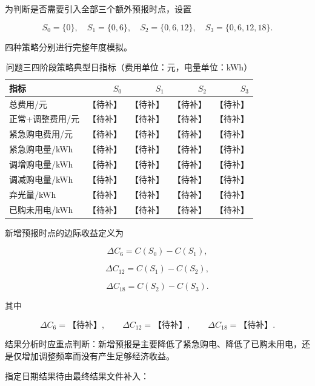 为判断是否需要引入全部三个额外预报时点，设置

\[
S_0=\{0\},
\quad
S_1=\{0,6\},
\quad
S_2=\{0,6,12\},
\quad
S_3=\{0,6,12,18\}.
\]

四种策略分别进行完整年度模拟。

\begin{table}[H]
\centering
{}
\begin{tabular}{lrrrr}
\toprule
指标 & \(S_0\) & \(S_1\) & \(S_2\) & \(S_3\) \\
\midrule
总费用/元 & 【待补】 & 【待补】 & 【待补】 & 【待补】 \\
正常+调整费用/元 & 【待补】 & 【待补】 & 【待补】 & 【待补】 \\
紧急购电费用/元 & 【待补】 & 【待补】 & 【待补】 & 【待补】 \\
紧急购电量/kWh & 【待补】 & 【待补】 & 【待补】 & 【待补】 \\
调增购电量/kWh & 【待补】 & 【待补】 & 【待补】 & 【待补】 \\
调减购电量/kWh & 【待补】 & 【待补】 & 【待补】 & 【待补】 \\
弃光量/kWh & 【待补】 & 【待补】 & 【待补】 & 【待补】 \\
已购未用电/kWh & 【待补】 & 【待补】 & 【待补】 & 【待补】 \\
\bottomrule
\end{tabular}
\caption{问题三四阶段策略典型日指标（费用单位：元，电量单位：kWh）}
\label{tab:8}
\end{table}

新增预报时点的边际收益定义为

\[
\Delta C_6=C(S_0)-C(S_1),
\]

\[
\Delta C_{12}=C(S_1)-C(S_2),
\]

\begin{equation}
\Delta C_{18}=C(S_2)-C(S_3).
\end{equation}

其中

\[
\Delta C_6=\text{【待补】},
\qquad
\Delta C_{12}=\text{【待补】},
\qquad
\Delta C_{18}=\text{【待补】}.
\]

结果分析时应重点判断：新增预报是主要降低了紧急购电、降低了已购未用电，还是仅增加调整频率而没有产生足够经济收益。

指定日期结果待由最终结果文件补入：


